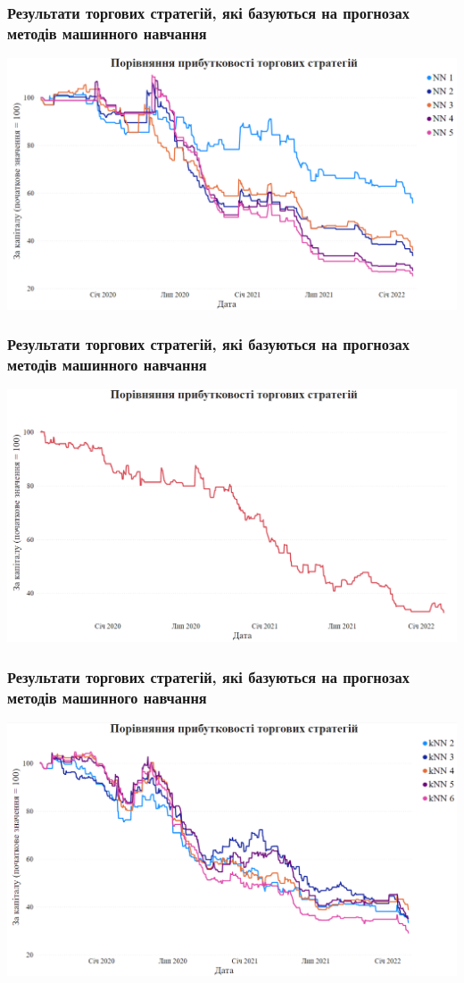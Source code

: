\documentclass[aspectratio=169]{beamer}
\begin{document}
\begin{frame}
\frametitle{Результати торгових стратегій, які базуються на прогнозах методів машинного навчання}
\begin{center}
\includegraphics[scale=0.33]{Results Part 3.png}
\end{center}
\end{frame}

\begin{frame}
\frametitle{Результати торгових стратегій, які базуються на прогнозах методів машинного навчання}
\begin{center}
\includegraphics[scale=0.33]{Results Part 4.png}
\end{center}
\end{frame}

\begin{frame}
\frametitle{Результати торгових стратегій, які базуються на прогнозах методів машинного навчання}
\begin{center}
\includegraphics[scale=0.33]{Results Part 5.png}
\end{center}
\end{frame}
\end{document}
